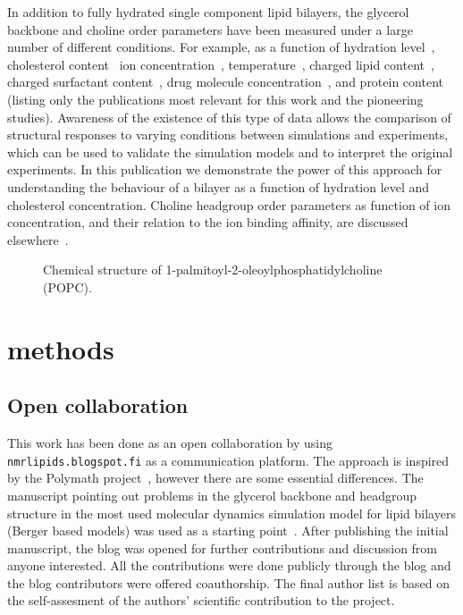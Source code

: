 \documentclass[pre,aps,floatfix,authordate1-4,twocolumn]{revtex4-1}
\begin{document}
In addition to fully hydrated single component lipid bilayers, the glycerol backbone and choline order parameters
have been measured under a large number of different conditions. For example, as a function of hydration level~\cite{bechinger91,ulrich94,dvinskikh05b}, cholesterol content~\cite{brown78,ferreira13}
ion concentration~\cite{brown77,akutsu81,altenbach84,roux90,roux91}, temperature~\cite{gally75}, charged lipid content~\cite{roux90,roux91}, charged surfactant content~\cite{scherer89}, 
drug molecule concentration~\cite{browning82,kelusky84,castro08}, and protein content~\cite{roux89,kuchinka89} (listing only the publications most relevant for this work and the pioneering studies).
Awareness of the existence of this type of data allows the comparison of structural responses to varying conditions between simulations and experiments,
which can be used to validate the simulation models and to interpret the original experiments. 
In this publication we demonstrate the power of this approach for understanding the behaviour of a bilayer as a function of hydration level and cholesterol concentration.
Choline headgroup order parameters as function of ion concentration, and their relation to the ion binding affinity, are discussed elsewhere~\cite{ionpaper}.

  \begin{figure}[]
  \centering

  \caption{\label{POPCstructure}
    Chemical structure of  1-palmitoyl-2-oleoylphosphatidylcholine (POPC).}
  
\end{figure}

\section{methods}

\subsection{Open collaboration}

This work has been done as an open collaboration by using \texttt{nmrlipids.blogspot.fi} as a communication platform.
The approach is inspired by the Polymath project~\cite{gowers09}, however there are some essential differences. The manuscript pointing out problems in the glycerol backbone and
headgroup structure in the most used molecular dynamics simulation model for lipid bilayers (Berger based models) was used as a starting point~\cite{ollila13}.
After publishing the initial manuscript, the blog was opened for further contributions and discussion from anyone interested. 
All the contributions were done publicly through the blog and the blog contributors were offered coauthorship. The final author list
is based on the self-assesment of the authors' scientific contribution to the project.
\end{document}
